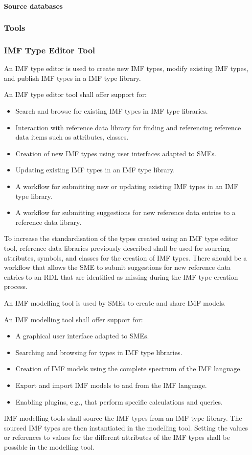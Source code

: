 \paragraph{Source databases}


\subsubsection{Tools}
\label{sec:tools}

\subsubsection{IMF Type Editor Tool}
An IMF type editor is used to create new IMF types, modify existing IMF types, and publish IMF types in a IMF type library.

An IMF type editor tool shall offer support for:

\begin{itemize}
  \item Search and browse for existing IMF types in IMF type libraries.
  \item Interaction with reference data library for finding and referencing reference data items such as attributes, classes.
  \item Creation of new IMF types using user interfaces adapted to SMEs.
  \item Updating existing IMF types in an IMF type library.
  \item A workflow for submitting new or updating existing IMF types in an IMF type library.
  \item A workflow for submitting suggestions for new reference data entries to a reference data library.
\end{itemize}
To increase the standardisation of the types created using an IMF type editor tool, reference data libraries
previously described shall be used for sourcing attributes, symbols, and classes for the creation of IMF types. There
should be a workflow that allows the SME to submit suggestions for new reference data entries to an RDL that are
identified as missing during the IMF type creation process.

An IMF modelling tool is used by SMEs to create and share IMF models.

An IMF modelling tool shall offer support for:

\begin{itemize}
\item A graphical user interface adapted to SMEs.
\item Searching and browsing for types in IMF type libraries.
\item Creation of IMF models using the complete spectrum of the IMF language.
\item Export and import IMF models to and from the IMF language.
\item Enabling plugins, e.g., that perform specific calculations and queries.
\end{itemize}
IMF modelling tools shall source the IMF types from an IMF type library. The sourced IMF types are then instantiated
in the modelling tool. Setting the values or references to values for the different attributes of the IMF types shall
be possible in the modelling tool.

